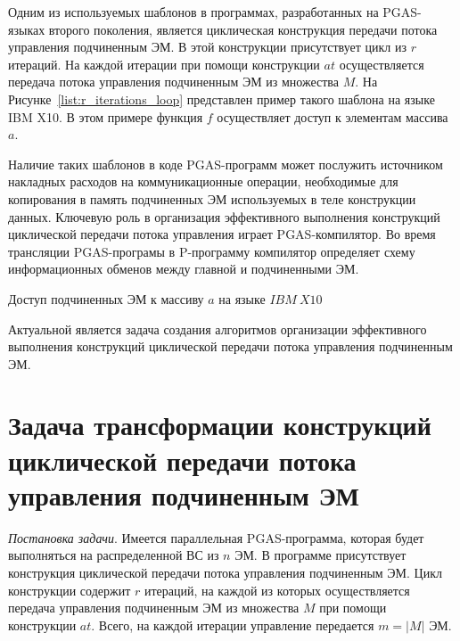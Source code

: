 
Одним из используемых шаблонов в программах, разработанных на PGAS-языках второго поколения, является циклическая конструкция передачи потока управления подчиненным ЭМ.
В этой конструкции присутствует цикл из $r$ итераций. На каждой итерации при помощи конструкции $at$ осуществляется передача потока управления подчиненным ЭМ из множества $M$. На Рисунке~\ref{list:r_iterations_loop} представлен пример такого шаблона на языке IBM X10. В этом примере функция $f$ осуществляет доступ к элементам массива $a$.

Наличие таких шаблонов в коде PGAS-программ может послужить источником накладных расходов на коммуникационные операции, необходимые для копирования в память подчиненных ЭМ используемых в теле конструкции данных. Ключевую роль в организация эффективного выполнения конструкций циклической передачи потока управления играет PGAS-компилятор. Во время трансляции PGAS-програмы в P-программу компилятор определяет схему информационных обменов между главной и подчиненными ЭМ.

\begin{ListingEnv}[!htp]
	
    \caption{Доступ подчиненных ЭМ к массиву $a$ на языке $IBM\ X10$}
    \label{list:r_iterations_loop}
\end{ListingEnv}

Актуальной является задача создания алгоритмов организации эффективного выполнения конструкций циклической передачи потока управления подчиненным ЭМ.

\section{Задача трансформации конструкций циклической передачи потока управления подчиненным ЭМ}

\textit{Постановка задачи}. Имеется параллельная PGAS-программа, которая будет выполняться на распределенной ВС из $n$ ЭМ. В программе присутствует конструкция циклической передачи потока управления подчиненным ЭМ. Цикл конструкции содержит $r$ итераций, на каждой из которых осуществляется передача управления подчиненным ЭМ из множества $M$ при помощи конструкции $at$. Всего, на каждой итерации управление передается $m = |M|$ ЭМ.

